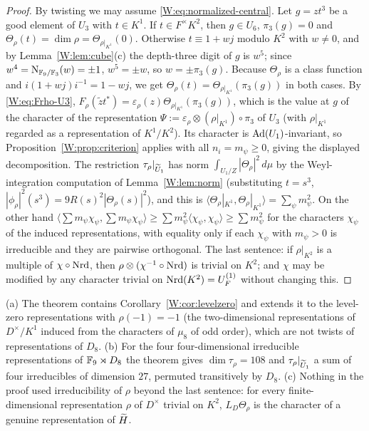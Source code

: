 \begin{proof}
By twisting we may assume \eqref{W:eq:normalized-central}.  Let $g=zt^3$
be a good element of $U_3$ with $t\in K^1$.  If $t\in F^\times K^2$, then
$g\in U_6$, $\pi_3(g)=0$ and $\Theta_\rho(t)=\dim\rho=\Theta_{\rho|_{K^1}}(0)$.
Otherwise $t\equiv1+wj$ modulo $K^2$ with $w\ne0$, and by
Lemma~\ref{W:lem:cube}(c) the depth-three digit of $g$ is $w^5$; since
$w^4=\operatorname N_{\mathbb F_9/\mathbb F_3}(w)=\pm1$, $w^5=\pm w$, so $w=\pm\pi_3(g)$.  Because
$\Theta_\rho$ is a class function and $i(1+wj)i^{-1}=1-wj$, we get
$\Theta_\rho(t)=\Theta_{\rho|_{K^1}}(\pi_3(g))$ in both cases.  By
\eqref{W:eq:Frho-U3}, $F_\rho(\tilde zt^*)=\varepsilon_\rho(z)\Theta_{\rho|_{K^1}}(\pi_3(g))$,
which is the value at $g$ of the character of the representation
$\Psi:=\varepsilon_\rho\otimes(\rho|_{K^1})\circ\pi_3$ of $U_3$ (with
$\rho|_{K^1}$ regarded as a representation of $K^1/K^2$).  Its character
is $\operatorname{Ad}(U_1)$-invariant, so Proposition~\ref{W:prop:criterion} applies
with all $n_i=m_\psi\ge0$, giving the displayed decomposition.
The restriction $\tau_\rho|_{\widetilde U_1}$ has norm
$\int_{U_1/Z}|\Theta_\rho|^2\,d\mu$ by the Weyl-integration computation
of Lemma~\ref{W:lem:norm} (substituting $t=s^3$, $|\phi_\rho|^2(s^3)=9R(s)^2|\Theta_\rho(s)|^2$),
and this is $\langle\Theta_\rho|_{K^1},\Theta_\rho|_{K^1}\rangle=\sum_\psi m_\psi^2$.
On the other hand $\langle\sum m_\psi\chi_\psi,\sum m_\psi\chi_\psi\rangle\ge\sum m_\psi^2\langle\chi_\psi,\chi_\psi\rangle\ge\sum m_\psi^2$
for the characters $\chi_\psi$ of the induced representations, with
equality only if each $\chi_\psi$ with $m_\psi>0$ is irreducible and
they are pairwise orthogonal.  The last sentence: if $\rho|_{K^2}$ is a multiple of
$\chi\circ\operatorname{Nrd}$, then $\rho\otimes(\chi^{-1}\circ\operatorname{Nrd})$ is trivial on
$K^2$; and $\chi$ may be modified by any character trivial on
$\operatorname{Nrd}(K^2)=U_F^{(1)}$ without changing this.
\end{proof}

\begin{remark}
(a) The theorem contains Corollary~\ref{W:cor:levelzero} and extends it to
the level-zero representations with $\rho(-1)=-1$ (the two-dimensional
representations of $D^\times/K^1$ induced from the characters of
$\mu_8$ of odd order), which are not twists of representations of $D_8$.
(b) For the four four-dimensional irreducible representations of
$\mathbb F_9\rtimes D_8$ the theorem gives $\dim\tau_\rho=108$ and
$\tau_\rho|_{\widetilde U_1}$ a sum of four irreducibles of dimension $27$,
permuted transitively by $D_8$.
(c) Nothing in the proof used irreducibility of $\rho$ beyond the last
sentence: for every finite-dimensional representation $\rho$ of
$D^\times$ trivial on $K^2$, $L_D\Theta_\rho$ is the character of a
genuine representation of $\widetilde H$.
\end{remark}

